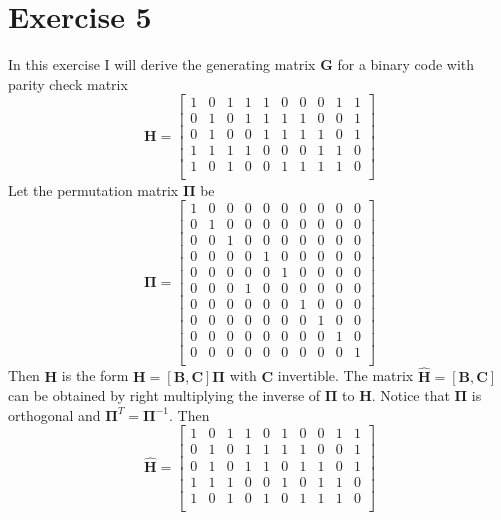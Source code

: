 \documentclass[10pt]{article}
\begin{document}
\section*{Exercise 5}
In this exercise I will derive the generating matrix $\mathbf{G}$ for a binary code with parity check matrix
\begin{equation}
	\mathbf{H} = 
	\begin{bmatrix}
		1&0&1&1&1&0&0&0&1&1\\
		0&1&0&1&1&1&1&0&0&1\\
		0&1&0&0&1&1&1&1&0&1\\
		1&1&1&1&0&0&0&1&1&0\\
		1&0&1&0&0&1&1&1&1&0\\
	\end{bmatrix}
\end{equation}
Let the permutation matrix $\mathbf{\Pi}$ be
\begin{equation}
	\mathbf{\Pi} = 
	\begin{bmatrix}
		1&0&0&0&0&0&0&0&0&0\\
		0&1&0&0&0&0&0&0&0&0\\
		0&0&1&0&0&0&0&0&0&0\\
		0&0&0&0&1&0&0&0&0&0\\
		0&0&0&0&0&1&0&0&0&0\\
		0&0&0&1&0&0&0&0&0&0\\
		0&0&0&0&0&0&1&0&0&0\\
		0&0&0&0&0&0&0&1&0&0\\
		0&0&0&0&0&0&0&0&1&0\\
		0&0&0&0&0&0&0&0&0&1\\
	\end{bmatrix}
\end{equation}
Then $\mathbf{H}$ is the form $\mathbf{H} = [\mathbf{B}, \mathbf{C}]\mathbf{\Pi}$ with $\mathbf{C}$ invertible. The matrix $\mathbf{\hat{H}} = [\mathbf{B}, \mathbf{C}]$ can be obtained by right multiplying the inverse of $\mathbf{\Pi}$ to $\mathbf{H}$. Notice that $\mathbf{\Pi}$ is orthogonal and $\mathbf{\Pi}^T = \mathbf{\Pi}^{-1}$. Then 
\begin{equation}
\mathbf{\hat{H}} =
	\begin{bmatrix}
		1&0&1&1&0&1&0&0&1&1\\
		0&1&0&1&1&1&1&0&0&1\\
		0&1&0&1&1&0&1&1&0&1\\
		1&1&1&0&0&1&0&1&1&0\\
		1&0&1&0&1&0&1&1&1&0\\
	\end{bmatrix}
\end{equation}
\end{document}
